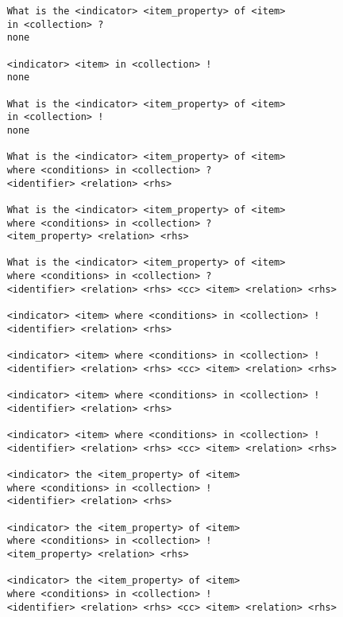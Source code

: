 \begin{verbatim}
    What is the <indicator> <item_property> of <item>
    in <collection> ?
    none

    <indicator> <item> in <collection> !
    none

    What is the <indicator> <item_property> of <item>
    in <collection> !
    none

    What is the <indicator> <item_property> of <item> 
    where <conditions> in <collection> ?
    <identifier> <relation> <rhs>

    What is the <indicator> <item_property> of <item> 
    where <conditions> in <collection> ?
    <item_property> <relation> <rhs>

    What is the <indicator> <item_property> of <item> 
    where <conditions> in <collection> ?
    <identifier> <relation> <rhs> <cc> <item> <relation> <rhs>

    <indicator> <item> where <conditions> in <collection> !
    <identifier> <relation> <rhs>

    <indicator> <item> where <conditions> in <collection> !
    <identifier> <relation> <rhs> <cc> <item> <relation> <rhs>

    <indicator> <item> where <conditions> in <collection> !
    <identifier> <relation> <rhs>

    <indicator> <item> where <conditions> in <collection> !
    <identifier> <relation> <rhs> <cc> <item> <relation> <rhs>

    <indicator> the <item_property> of <item> 
    where <conditions> in <collection> !
    <identifier> <relation> <rhs>

    <indicator> the <item_property> of <item> 
    where <conditions> in <collection> !
    <item_property> <relation> <rhs>

    <indicator> the <item_property> of <item> 
    where <conditions> in <collection> !
    <identifier> <relation> <rhs> <cc> <item> <relation> <rhs>
    \end{verbatim}
\endgroup